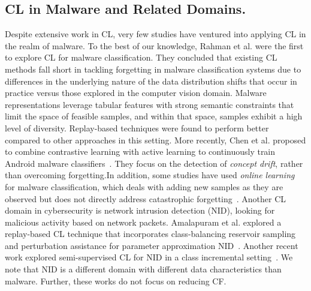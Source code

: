 \subsection{CL in Malware and Related Domains.} 
Despite extensive work in CL, very few studies have ventured into applying CL in the realm of malware. To the best of our knowledge, Rahman et al.\cite{continual-learning-malware} were the first to explore CL for malware classification. They concluded that existing CL methods fall short in tackling forgetting in malware classification systems due to differences in the underlying nature of the data distribution shifts that occur in practice versus those explored in the computer vision domain. Malware representations leverage tabular features with strong semantic constraints that limit the space of feasible samples, and within that space, samples exhibit a high level of diversity. Replay-based techniques were found to perform better compared to other approaches in this setting. More recently, Chen et al. proposed to combine contrastive learning with active learning to continuously train Android malware classifiers~\cite{chen2023continuous}. They focus on the detection of {\em concept drift}, rather than overcoming forgetting.In addition, some studies have used \emph{online learning} for malware classification, which deals with adding new samples as they are observed but does not directly address catastrophic forgetting~\cite{droidevolver}. 
Another CL domain in cybersecurity is network intrusion detection (NID), looking for malicious activity based on network packets. Amalapuram et al. explored a replay-based CL technique that incorporates class-balancing reservoir sampling and perturbation assistance for parameter approximation NID~\cite{channappayya2024augmented}. Another recent work explored semi-supervised CL for NID in a class incremental setting~\cite{amalapuram2024spider}. We note that NID is a different domain with different data characteristics than malware. Further, these works do not focus on reducing CF. 






